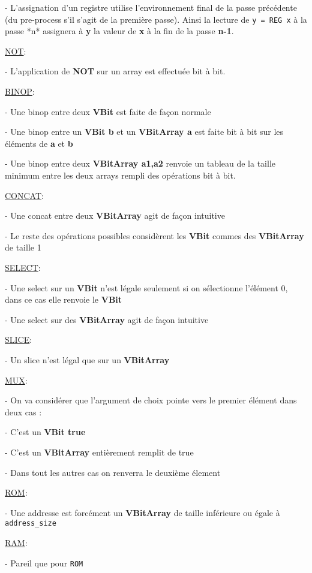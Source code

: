 \documentclass{article}
\begin{document}
- L'assignation d'un registre utilise l'environnement final de la passe précédente (du pre-process s'il s'agit de la première passe). Ainsi la lecture de \verb|y = REG x| à la passe *n* assignera à \textbf{y} la valeur de \textbf{x} à la fin de la passe \textbf{n-1}. 

\underline{NOT}:

- L'application de \textbf{NOT} sur un array est effectuée bit à bit.

\underline{BINOP}:

- Une binop entre deux \textbf{VBit} est faite de façon normale

- Une binop entre un \textbf{VBit b} et un \textbf{VBitArray a}  est faite bit à bit sur les éléments de \textbf{a} et \textbf{b}

- Une binop entre deux \textbf{VBitArray a1,a2} renvoie un tableau de la taille minimum entre les deux arrays rempli des opérations bit à bit. 

\underline{CONCAT}:

- Une concat entre deux \textbf{VBitArray} agit de façon intuitive

- Le reste des opérations possibles considèrent les \textbf{VBit} commes des \textbf{VBitArray} de taille 1

\underline{SELECT}:

- Une select sur un \textbf{VBit} n'est légale seulement si on sélectionne l'élément 0, dans ce cas elle renvoie le \textbf{VBit}

- Une select sur des \textbf{VBitArray} agit de façon intuitive

\underline{SLICE}:

- Un slice n'est légal que sur un \textbf{VBitArray}

\underline{MUX}:

- On va considérer que l'argument de choix pointe vers le premier élément dans deux cas :

  - C'est un \textbf{VBit true}

  - C'est un \textbf{VBitArray} entièrement remplit de true

- Dans tout les autres cas on renverra le deuxième élement

\underline{ROM}:

- Une addresse est forcément un \textbf{VBitArray} de taille inférieure ou égale à \verb|address_size|

\underline{RAM}:

- Pareil que pour \verb|ROM|
\end{document}

